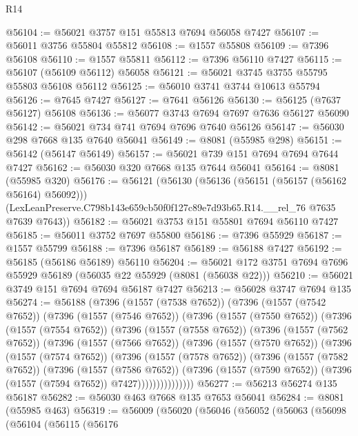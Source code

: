\begin{lexlean}{R14}
\begin{coremodule}
@56104 := @56021 @3757 @151 @55813 @7694 @56058 @7427
@56107 := @56011 @3756 @55804 @55812
@56108 := @1557 @55808
@56109 := @7396 @56108
@56110 := @1557 @55811
@56112 := @7396 @56110 @7427
@56115 := @56107 (@56109 @56112) @56058
@56121 := @56021 @3745 @3755 @55795 @55803 @56108 @56112
@56125 := @56010 @3741 @3744 @10613 @55794
@56126 := @7645 @7427
@56127 := @7641 @56126
@56130 := @56125 (@7637 @56127) @56108
@56136 := @56077 @3743 @7694 @7697 @7636 @56127 @56090
@56142 := @56021 @734 @741 @7694 @7696 @7640 @56126
@56147 := @56030 @298 @7668 @135 @7640 @56041
@56149 := @8081 (@55985 @298)
@56151 := @56142 (@56147 @56149)
@56157 := @56021 @739 @151 @7694 @7694 @7644 @7427
@56162 := @56030 @320 @7668 @135 @7644 @56041
@56164 := @8081 (@55985 @320)
@56176 := @56121
    (@56130
      (@56136 (@56151 (@56157 (@56162 @56164) @56092)))
      (LexLeanPreserve.C798b143e659cb50f0f127c89e7d93b65.R14.__rel_76 @7635 @7639 @7643))
@56182 := @56021 @3753 @151 @55801 @7694 @56110 @7427
@56185 := @56011 @3752 @7697 @55800
@56186 := @7396 @55929
@56187 := @1557 @55799
@56188 := @7396 @56187
@56189 := @56188 @7427
@56192 := @56185 (@56186 @56189) @56110
@56204 := @56021 @172 @3751 @7694 @7696 @55929 @56189 (@56035 @22 @55929 (@8081 (@56038 @22)))
@56210 := @56021 @3749 @151 @7694 @7694 @56187 @7427
@56213 := @56028 @3747 @7694 @135
@56274 := @56188
    (@7396
      (@1557 (@7538 @7652))
      (@7396
        (@1557 (@7542 @7652))
        (@7396
          (@1557 (@7546 @7652))
          (@7396
            (@1557 (@7550 @7652))
            (@7396
              (@1557 (@7554 @7652))
              (@7396
                (@1557 (@7558 @7652))
                (@7396
                  (@1557 (@7562 @7652))
                  (@7396
                    (@1557 (@7566 @7652))
                    (@7396
                      (@1557 (@7570 @7652))
                      (@7396
                        (@1557 (@7574 @7652))
                        (@7396
                          (@1557 (@7578 @7652))
                          (@7396
                            (@1557 (@7582 @7652))
                            (@7396
                              (@1557 (@7586 @7652))
                              (@7396
                                (@1557 (@7590 @7652))
                                (@7396 (@1557 (@7594 @7652)) @7427)))))))))))))))
@56277 := @56213 @56274 @135 @56187
@56282 := @56030 @463 @7668 @135 @7653 @56041
@56284 := @8081 (@55985 @463)
@56319 := @56009
    (@56020
      (@56046
        (@56052
          (@56063
            (@56098
              (@56104
                (@56115
                  (@56176

\end{coremodule}
\end{lexlean}

